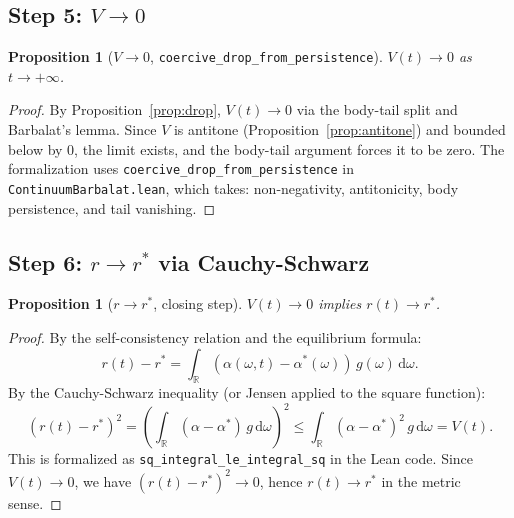 \documentclass[11pt,a4paper]{article}
\newtheorem{proposition}[theorem]{Proposition}
\theoremstyle{definition}
\newcommand{\R}{\mathbb{R}}
\begin{document}
\subsection{Step 5: $V \to 0$}

\begin{proposition}[$V \to 0$, \texttt{coercive\_drop\_from\_persistence}]\label{prop:vzero}
$V(t) \to 0$ as $t \to +\infty$.
\end{proposition}

\begin{proof}
By Proposition~\ref{prop:drop}, $V(t) \to 0$ via the body-tail split and Barbalat's lemma. Since $V$ is antitone (Proposition~\ref{prop:antitone}) and bounded below by $0$, the limit exists, and the body-tail argument forces it to be zero. The formalization uses \texttt{coercive\_drop\_from\_persistence} in \texttt{ContinuumBarbalat.lean}, which takes: non-negativity, antitonicity, body persistence, and tail vanishing.
\end{proof}

\subsection{Step 6: $r \to r^*$ via Cauchy-Schwarz}\label{sec:cauchy}

\begin{proposition}[$r \to r^*$, closing step]\label{prop:rconv}
$V(t) \to 0$ implies $r(t) \to r^*$.
\end{proposition}

\begin{proof}
By the self-consistency relation and the equilibrium formula:
\[
r(t) - r^* = \int_\R (\alpha(\omega,t) - \alpha^*(\omega))\,g(\omega)\,\mathrm{d}\omega.
\]
By the Cauchy-Schwarz inequality (or Jensen applied to the square function):
\[
(r(t) - r^*)^2 = \left(\int_\R (\alpha - \alpha^*)\,g\,\mathrm{d}\omega\right)^2 \leq \int_\R (\alpha - \alpha^*)^2\,g\,\mathrm{d}\omega = V(t).
\]
This is formalized as \texttt{sq\_integral\_le\_integral\_sq} in the Lean code. Since $V(t) \to 0$, we have $(r(t)-r^*)^2 \to 0$, hence $r(t) \to r^*$ in the metric sense.
\end{proof}
\end{document}
